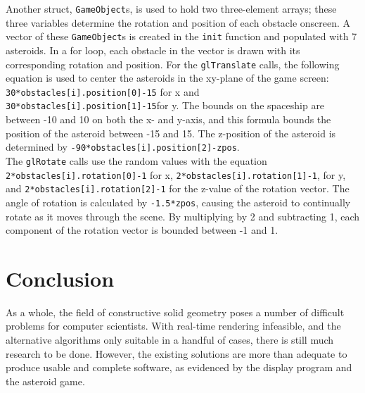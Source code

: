 \documentclass[12pt]{article}
\begin{document}
\begin{doublespace}
Another struct, \texttt{GameObject}s, is used to hold two three-element arrays; these three variables determine the rotation and position of each obstacle onscreen. A vector of these \texttt{GameObject}s is created in the \texttt{init} function and populated with 7 asteroids. In a for loop, each obstacle in the vector is drawn with its corresponding rotation and position. For the \texttt{glTranslate} calls, the following equation is used to center the asteroids in the xy-plane of the game screen: \texttt{30*obstacles[i].position[0]-15} for x and \texttt{30*obstacles[i].position[1]-15}for y. The bounds on the spaceship are between -10 and 10 on both the x- and y-axis, and this formula bounds the position of the asteroid between -15 and 15. The z-position of the asteroid is determined by \texttt{-90*obstacles[i].position[2]-zpos}.  \\

The \texttt{glRotate} calls use the random values with the equation \texttt{2*obstacles[i].rotation[0]-1} for x, \texttt{2*obstacles[i].rotation[1]-1}, for y, and \texttt{2*obstacles[i].rotation[2]-1} for the z-value of the rotation vector. The angle of rotation is calculated by \texttt{-1.5*zpos}, causing the asteroid to continually rotate as it moves through the scene. By multiplying by 2 and subtracting 1, each component of the rotation vector is bounded between -1 and 1.
\section{Conclusion}
As a whole, the field of constructive solid geometry poses a number of difficult problems for computer scientists. With real-time rendering infeasible, and the alternative algorithms only suitable in a handful of cases, there is still much research to be done. However, the existing solutions are more than adequate to produce usable and complete software, as evidenced by the display program and the asteroid game.
\newpage
\end{doublespace}
\end{document}
